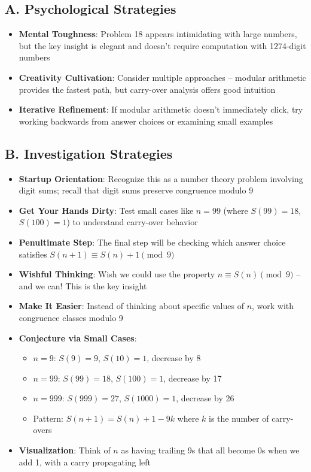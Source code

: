 \documentclass[]{article}
\begin{document}
\begin{strategicbox}
\subsection*{A. Psychological Strategies}
\begin{itemize}[leftmargin=*]
    \item \textbf{Mental Toughness}: Problem 18 appears intimidating with large numbers, but the key insight is elegant and doesn't require computation with 1274-digit numbers
    \item \textbf{Creativity Cultivation}: Consider multiple approaches -- modular arithmetic provides the fastest path, but carry-over analysis offers good intuition
    \item \textbf{Iterative Refinement}: If modular arithmetic doesn't immediately click, try working backwards from answer choices or examining small examples
\end{itemize}

\subsection*{B. Investigation Strategies}
\begin{itemize}[leftmargin=*]
    \item \textbf{Startup Orientation}: Recognize this as a number theory problem involving digit sums; recall that digit sums preserve congruence modulo 9
    \item \textbf{Get Your Hands Dirty}: Test small cases like $n = 99$ (where $S(99) = 18$, $S(100) = 1$) to understand carry-over behavior
    \item \textbf{Penultimate Step}: The final step will be checking which answer choice satisfies $S(n+1) \equiv S(n) + 1 \pmod{9}$
    \item \textbf{Wishful Thinking}: Wish we could use the property $n \equiv S(n) \pmod{9}$ -- and we can! This is the key insight
    \item \textbf{Make It Easier}: Instead of thinking about specific values of $n$, work with congruence classes modulo 9
    \item \textbf{Conjecture via Small Cases}: 
    \begin{itemize}
        \item $n = 9$: $S(9) = 9$, $S(10) = 1$, decrease by 8
        \item $n = 99$: $S(99) = 18$, $S(100) = 1$, decrease by 17
        \item $n = 999$: $S(999) = 27$, $S(1000) = 1$, decrease by 26
        \item Pattern: $S(n+1) = S(n) + 1 - 9k$ where $k$ is the number of carry-overs
    \end{itemize}
    \item \textbf{Visualization}: Think of $n$ as having trailing 9s that all become 0s when we add 1, with a carry propagating left
\end{itemize}


\end{strategicbox}
\end{document}
